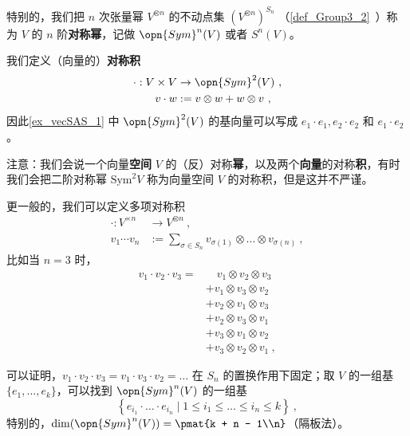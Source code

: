 特别的，我们把 $n$ 次张量幂 $V^{\otimes n}$ 的不动点集 $(V^{\otimes n})^{S_n}$ （\autoref{def_Group3_2}~）称为 $V$ 的 $n$ 阶\textbf{对称幂}，记做 $\opn{Sym}^n(V)$ 或者 $S^n(V)$。

我们定义（向量的）\textbf{对称积}
\begin{equation}
\begin{aligned}
\cdot: V \times V &\to \opn{Sym}^2(V)~, \\
v \cdot w &:= v \otimes w + w \otimes v~,
\end{aligned}
\end{equation}
因此\autoref{ex_vecSAS_1} 中 $\opn{Sym}^2(V)$ 的基向量可以写成 $e_1 \cdot e_1, e_2 \cdot e_2$ 和 $e_1 \cdot e_2$。


注意：我们会说一个向量\textbf{空间} $V$ 的（反）对称\textbf{幂}，以及两个\textbf{向量}的对称\textbf{积}，有时我们会把二阶对称幂 $\text{Sym}^2 V$ 称为向量空间 $V$ 的对称积，但是这并不严谨。

更一般的，我们可以定义多项对称积
\begin{equation}
\begin{aligned}
\cdot: V^{\times n} &\to V^{\otimes n}~, \\
v_1 \cdots v_n &:= \sum_{\sigma \in S_n} v_{\sigma(1)} \otimes \dots \otimes v_{\sigma(n)}~,
\end{aligned}
\end{equation}
比如当 $n = 3$ 时，
\begin{equation}
\begin{aligned}
v_1 \cdot v_2 \cdot v_3 = &\quad v_1 \otimes v_2 \otimes v_3 \\
&+ v_1 \otimes v_3 \otimes v_2 \\
&+ v_2 \otimes v_1 \otimes v_3 \\
&+ v_2 \otimes v_3 \otimes v_1 \\
&+ v_3 \otimes v_1 \otimes v_2 \\
&+ v_3 \otimes v_2 \otimes v_1~,
\end{aligned}
\end{equation}

可以证明，$v_1 \cdot v_2 \cdot v_3 = v_1 \cdot v_3 \cdot v_2 = \dots$ 在 $S_n$ 的置换作用下固定；取 $V$ 的一组基 $\{e_1, \dots, e_k\}$，可以找到 $\opn{Sym}^n(V)$ 的一组基
\begin{equation}
\left\{ e_{i_1} \cdot \dots \cdot e_{i_n} \mid 1 \leq i_1 \leq \dots \leq i_n \leq k \right\}~,
\end{equation}
特别的，$\dim(\opn{Sym}^n(V)) = \pmat{k + n - 1\\n}$（隔板法）。


